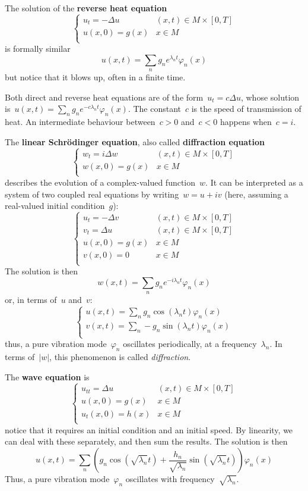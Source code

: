 The solution of the {\bf reverse heat equation}
$$
\begin{cases}
	u_t = -\Delta u & (x,t)\in M\times[0,T] \\
	u(x,0)=g(x) & x\in M\\
\end{cases}
$$
is formally similar
$$
u(x,t)=\sum_ng_ne^{{\lambda_n}t}\varphi_n(x)
$$
but notice that it blows up, often in a finite time.

Both direct and reverse heat equations are of the form~$u_t=c\Delta u$, whose
solution is~$u(x,t)=\sum_n g_n e^{-c\lambda_n t}\varphi_n(x)$.  The
constant~$c$ is the speed of transmission of heat.  An intermediate behaviour
between~$c>0$ and~$c<0$ happens when~$c=i$.

The {\bf linear Schrödinger equation}, also called {\bf diffraction equation}
$$
\begin{cases}
	w_t = i\Delta w & (x,t)\in M\times[0,T] \\
	w(x,0)=g(x) & x\in M\\
\end{cases}
$$
describes the evolution of a complex-valued function~$w$.  It can be
interpreted as a system of two coupled real equations by writing~$w=u+iv$
(here, assuming a real-valued initial condition~$g$):
$$
\begin{cases}
	u_t = -\Delta v & (x,t)\in M\times[0,T] \\
	v_t = \Delta u & (x,t)\in M\times[0,T] \\
	u(x,0)=g(x) & x\in M\\
	v(x,0)=0 & x\in M\\
\end{cases}
$$
The solution is then
$$
w(x,t)=\sum_n g_n e^{-i\lambda_n t}\varphi_n(x)
$$
or, in terms of~$u$ and~$v$:
$$
\begin{cases}
	u(x,t) = \sum_n g_n\cos\left(\lambda_nt\right)\varphi_n(x) \\
	v(x,t) = \sum_n-g_n\sin\left(\lambda_nt\right)\varphi_n(x) \\
\end{cases}
$$
thus, a pure vibration mode~$\varphi_n$ oscillates periodically, at a
frequency~$\lambda_n$.  In terms of~$|w|$, this phenomenon is called
\emph{diffraction}.

The {\bf wave equation} is
$$
\begin{cases}
	u_{tt} = \Delta u & (x,t)\in M\times[0,T] \\
	u(x,0) = g(x) & x\in M \\
	u_t(x,0) = h(x) & x\in M \\
\end{cases}
$$
notice that it requires an initial condition and an initial speed.  By
linearity, we can deal with these separately, and then sum the
results.  The solution is then
$$
	u(x,t)=\sum_n\left(
	g_n\cos\left(\sqrt{\lambda_n} t\right)
	+
	\frac{h_n}{\sqrt{\lambda_n}}\sin\left(\sqrt{\lambda_n} t\right)
	\right)\varphi_n(x)
$$
Thus, a pure vibration mode~$\varphi_n$ oscillates with
frequency~$\sqrt{\lambda_n}$.

